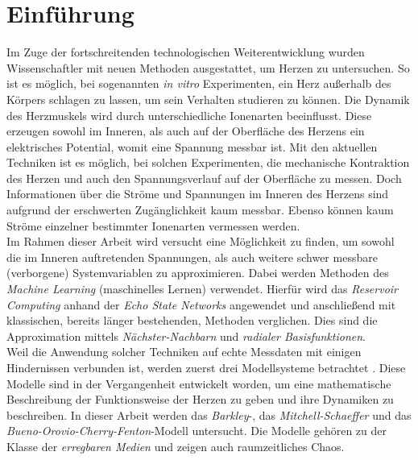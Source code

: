 \chapter{Einführung}
Im Zuge der fortschreitenden technologischen Weiterentwicklung wurden Wissenschaftler mit neuen Methoden ausgestattet, um Herzen zu untersuchen. So ist es möglich, bei sogenannten \textit{in vitro} Experimenten, ein Herz außerhalb des Körpers schlagen zu lassen, um sein Verhalten studieren zu können. Die Dynamik des Herzmuskels wird durch unterschiedliche Ionenarten beeinflusst. Diese erzeugen sowohl im Inneren, als auch auf der Oberfläche des Herzens ein elektrisches Potential, womit eine Spannung messbar ist. Mit den aktuellen Techniken ist es möglich, bei solchen Experimenten, die mechanische Kontraktion des Herzen und auch den Spannungsverlauf auf der Oberfläche zu messen. Doch Informationen über die Ströme und Spannungen im Inneren des Herzens sind aufgrund der erschwerten Zugänglichkeit kaum messbar. Ebenso können kaum Ströme einzelner bestimmter Ionenarten vermessen werden. \\

Im Rahmen dieser Arbeit wird versucht eine Möglichkeit zu finden, um sowohl die im Inneren auftretenden Spannungen, als auch weitere schwer messbare (verborgene) Systemvariablen zu approximieren. Dabei werden Methoden des \textit{Machine Learning} (maschinelles Lernen) verwendet. Hierfür wird das \textit{Reservoir Computing} anhand der \textit{Echo State Networks} angewendet und anschließend mit klassischen, bereits länger bestehenden, Methoden verglichen. Dies sind die Approximation mittels \textit{Nächster-Nachbarn} und \textit{radialer Basisfunktionen}.\\
  
Weil die Anwendung solcher Techniken auf echte Messdaten mit einigen Hindernissen verbunden ist, werden zuerst drei Modellsysteme betrachtet \citep{Barkley:2008, mitchell2003two, Bueno-Orovio2008}. Diese Modelle sind in der Vergangenheit entwickelt worden, um eine mathematische Beschreibung der Funktionsweise der Herzen zu geben und ihre Dynamiken zu beschreiben. In dieser Arbeit werden das \textit{Barkley}-, das \textit{Mitchell-Schaeffer} und das \textit{Bueno-Orovio-Cherry-Fenton}-Modell untersucht. Die Modelle gehören zu der Klasse der \textit{erregbaren Medien} und zeigen auch raumzeitliches Chaos.\\


